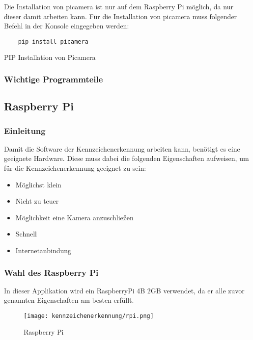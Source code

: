 Die Installation von picamera ist nur auf dem Raspberry Pi möglich, da nur dieser damit arbeiten kann. 
Für die Installation von picamera muss folgender Befehl in der Konsole eingegeben werden:

\begin{listing}[H]
    \begin{verbatim}
    pip install picamera
    \end{verbatim}
    \caption{PIP Installation von Picamera}
\end{listing}

\subsubsection{Wichtige Programmteile}



\subsection{Raspberry Pi}

\subsubsection{Einleitung}
Damit die Software der Kennzeichenerkennung arbeiten kann, benötigt es eine geeignete Hardware. Diese muss dabei die folgenden Eigenschaften 
aufweisen, um für die Kennzeichenerkennung geeignet zu sein:

\begin{itemize}
    \item Möglichst klein
    \item Nicht zu teuer 
    \item Möglichkeit eine Kamera anzuschließen 
    \item Schnell 
    \item Internetanbindung
\end{itemize}

\subsubsection{Wahl des Raspberry Pi}
In dieser Applikation wird ein RaspberryPi 4B 2GB verwendet, da er alle zuvor genannten Eigenschaften am besten erfüllt.\\

\begin{figure}[H]
    \centering
    \texttt{[image: kennzeichenerkennung/rpi.png]}
    \caption{Raspberry Pi}
\end{figure}

